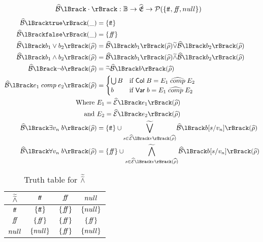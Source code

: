 \begin{align}
    \absboolsem{\cdot} &: \mathbb{B} \rightarrow \ab{\mathfrak{E}} \rightarrow \mathcal{P}(\{\true, \false, \mnull\}) \label{eq:bool-operation}
\end{align}
\begin{align}
    \absboolsem{\texttt{true}}(\_) &= \{\true\} \label{eq:abstract-bool-semantics-start} \\
    \absboolsem{\texttt{false}}(\_) &= \{\false\} \\
    \absboolsem{b_1 \lor b_2}(\ab{\environment}) &= \absboolsem{b_1}(\ab{\environment}) \aab{\lor} \absboolsem{b_2}(\ab{\environment}) \\
    \absboolsem{b_1 \land b_2}(\ab{\environment}) &= \absboolsem{b_1}(\ab{\environment}) \aab{\land} \absboolsem{b_2}(\ab{\environment}) \\
    \absboolsem{\neg b}(\ab{\environment}) &= \aab{\neg} \absboolsem{b}(\ab{\environment}) \\
    \absboolsem{e_1 \;comp\; e_2}(\ab{\environment}) &=
    \begin{cases}
        \bigcup B & \text{if } \mathsf{Col} \; B = E_1 \;\ab{\comp}\; E_2 \\
        b & \text{if } \mathsf{Var} \; b = E_1 \;\ab{\comp}\; E_2
    \end{cases}\\
    \text{Where }& E_1 = \absexpsem{e_1}(\ab{\environment}) \\
    \text{and }& E_2 = \absexpsem{e_2}(\ab{\environment}) \\
    \absboolsem{\exists v_n \; b}(\ab{\environment}) &= \{\true\} \cup \underset{s \in \absexpsem{v}(\ab{\environment})}{\aab{\bigvee}} \absboolsem{b[s/v_n]}(\ab{\environment}) \\
    \absboolsem{\forall v_n \; b}(\ab{\environment}) &= \{\false\} \cup \underset{s \in \absexpsem{v}(\ab{\environment})}{\aab{\bigwedge}} \absboolsem{b[s/v_n]}(\ab{\environment}) \label{eq:abstract-bool-semantics-end}
\end{align}


\begin{table}[H]
    \centering
    \caption{Truth table for $\widetilde{\widetilde{\land}}$}
    \begin{tabular}{c|ccc}
        $\widetilde{\widetilde{\land}}$ & $t\!t$ & $f\!\!f$ & $null$ \\
        \hline
        $t\!t$ & $\{t\!t\}$ & $\{f\!\!f\}$ & $\{null\}$ \\
        $f\!\!f$ & $\{f\!\!f\}$ & $\{f\!\!f\}$ & $\{f\!\!f\}$ \\
        $null$ & $\{null\}$ & $\{f\!\!f\}$ & $\{null\}$ \\
    \end{tabular}
    \label{tab:aaabland}
\end{table}

